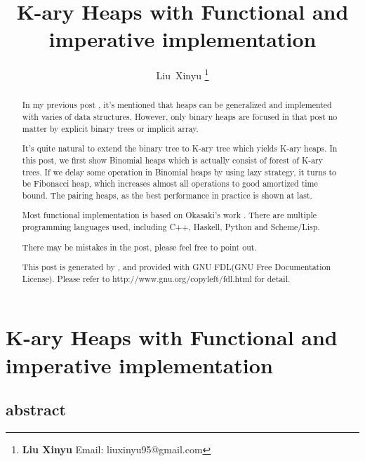 \documentclass{article}
\begin{document}
\fi


\title{K-ary Heaps with Functional and imperative implementation}

\author{Liu~Xinyu
\thanks{{\bfseries Liu Xinyu } \newline
  Email: liuxinyu95@gmail.com \newline}
  }


\maketitle

\ifx\wholebook\relax
\chapter{K-ary Heaps with Functional and imperative implementation}

\section{abstract}
\else
\begin{abstract}
\fi
In my previous post \cite{lxy-bheap}, it's mentioned that heaps can be
generalized and implemented with varies of data structures. However,
only binary heaps are focused in that post no matter by explicit binary
trees or implicit array. 

It's quite natural to extend the binary tree to K-ary tree which yields
K-ary heaps. In this post, we first show Binomial heaps which is actually
consist of forest of K-ary trees. If we delay some operation in Binomial
heaps by using lazy strategy, it turns to be Fibonacci heap, which increases
almost all operations to good amortized time bound. The pairing heaps,
as the best performance in practice is shown at last.

Most functional implementation is based on Okasaki's work \cite{okasaki-book}.
There are multiple programming languages used, including C++, Haskell, 
Python and Scheme/Lisp.

There may be mistakes in the post, please feel free to point out.

This post is generated by \LaTeXe, and provided with GNU FDL(GNU Free Documentation License).
Please refer to http://www.gnu.org/copyleft/fdl.html for detail.

\ifx\wholebook\relax \else
\end{abstract}
\fi
\end{document}
